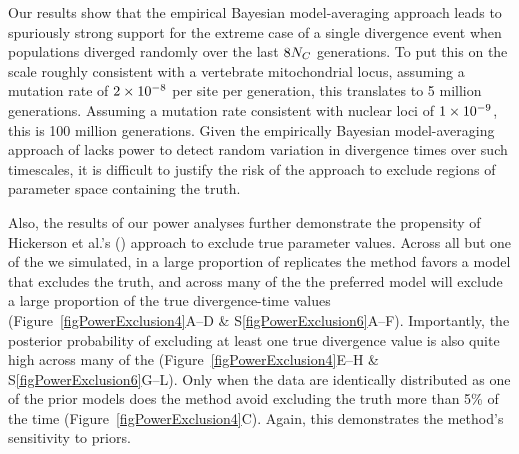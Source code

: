 Our results show that the empirical Bayesian model-averaging approach leads to
spuriously strong support for the extreme case of a single divergence event
when populations diverged randomly over the last $8N_C$ generations.
To put this on the scale roughly consistent with a vertebrate mitochondrial
locus, assuming a mutation rate of $2\times 10^{-8}$ per site per generation, this
translates to 5 million generations.
Assuming a mutation rate consistent with nuclear loci of $1\times 10^{-9}$, this is 100
million generations.
Given the empirically Bayesian model-averaging approach of \citet{Hickerson2013}
lacks power to detect random variation in divergence times over such
timescales, it is difficult to justify the risk of the approach to exclude
regions of parameter space containing the truth.

Also, the results of our power analyses further demonstrate the propensity of
Hickerson et al.'s (\citeyear{Hickerson2013}) approach to exclude true
parameter values.
Across all but one of the  we simulated, in a large proportion of
replicates the method favors a model that excludes the truth, and across many
of the  the preferred model will exclude a large proportion of the
true divergence-time values (Figure~\ref{figPowerExclusion4}A--D \&
S\ref{figPowerExclusion6}A--F).
Importantly, the posterior probability of excluding at least one true
divergence value is also quite high across many of the 
(Figure~\ref{figPowerExclusion4}E--H \& S\ref{figPowerExclusion6}G--L).
Only when the data are identically distributed as one of the prior models does
the method avoid excluding the truth more than 5\% of the time
(Figure~\ref{figPowerExclusion4}C).
Again, this demonstrates the method's sensitivity to priors.



